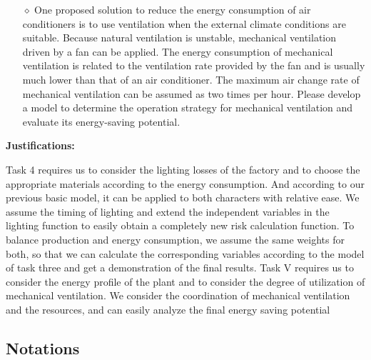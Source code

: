 \begin{itemize}
\begin{itemize}
        \item[$\diamond$]One proposed solution to reduce the energy consumption of air conditioners is to use ventilation when the external climate conditions are suitable. Because natural ventilation is unstable, mechanical ventilation driven by a fan can be applied. The energy consumption of mechanical ventilation is related to the ventilation rate provided by the fan and is usually much lower than that of an air conditioner. The maximum air change rate of mechanical ventilation can be assumed as two times per hour. Please develop a model to determine the operation strategy for mechanical ventilation and evaluate its energy-saving potential.
    \end{itemize}
    
    \textbf{Justifications:}
    
    \begin{comment}]
    任务四要求我们考虑工厂的照明损耗，并根据能耗的情况选择相应的材料。而根据我们前面的基本模型，可以较为轻松的应用在这两个人物之中。我们假定照明的时间，并在照明函数中进行自变量的扩展，从而轻松得到全新的险种计算函数。为了平衡产量和能源消耗，我们假定二者的权重一样，从而可以根据任务三的模型计算出相应的变量，得到最终的结果演示。任务五要求我们考虑工厂的能量情况，并考虑机械通风的利用度。我们考虑了机械通风的协调性和资源的情况，可以轻松地分析最终的节能潜力。
    \end{comment}
    
    Task 4 requires us to consider the lighting losses of the factory and to choose the appropriate materials according to the energy consumption. And according to our previous basic model, it can be applied to both characters with relative ease. We assume the timing of lighting and extend the independent variables in the lighting function to easily obtain a completely new risk calculation function. To balance production and energy consumption, we assume the same weights for both, so that we can calculate the corresponding variables according to the model of task three and get a demonstration of the final results. Task V requires us to consider the energy profile of the plant and to consider the degree of utilization of mechanical ventilation. We consider the coordination of mechanical ventilation and the resources, and can easily analyze the final energy saving potential


\end{itemize}



\subsection{Notations}

